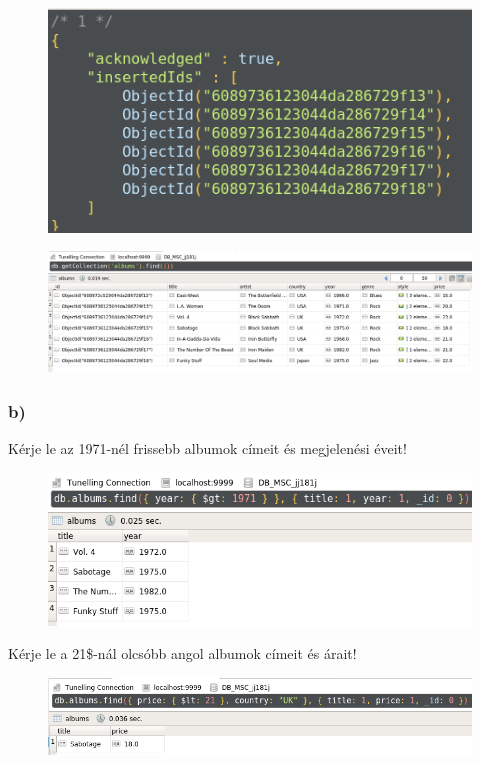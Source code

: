 \documentclass[a4paper, 12pt]{article}
\begin{document}
\begin{figure}[!hb]
	\centering
	\includegraphics[scale = 0.4]{images/1_a4.png}
	\label{fig:1_a4}
\end{figure}	

\begin{figure}[!hb]
	\centering
	\includegraphics[scale = 0.4]{images/1_a5.png}
	\label{fig:1_a5}
\end{figure}
\clearpage
\subsubsection*{b)}
Kérje le az 1971-nél frissebb albumok címeit és megjelenési éveit!
\begin{figure}[!hb]
	\centering
	\includegraphics[scale = 0.55]{images/1_b1.png}
	\label{fig:1_b1}
\end{figure}

\noindent Kérje le a 21\$-nál olcsóbb angol albumok címeit és árait!
\begin{figure}[!hb]
	\centering
	\includegraphics[scale = 0.55]{images/1_b2.png}
	\label{fig:1_b2}
\end{figure}
\end{document}
